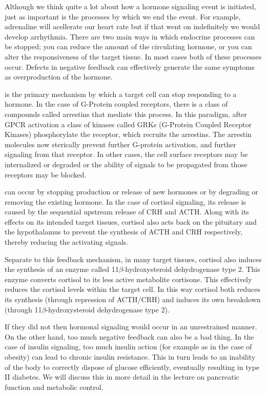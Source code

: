 \documentclass{tufte-handout}
\begin{document}
Although we think quite a lot about how a hormone signaling event is initiated, just as important is the processes by which we end the event.  For example, adrenaline will acellerate our heart rate but if that went on indefinitely we would develop arrhythmia.  There are two main ways in which endocrine processes can be stopped;  you can reduce the amount of the circulating hormone, or you can alter the responsiveness of the target tissue.  In most cases both of these processes occur.  Defects in negative feedback can effectively generate the same symptoms as overproduction of the hormone.

 is the primary mechanism by which a target cell can stop responding to a hormone.  In the case of G-Protein coupled receptors, there is a class of compounds called arrestins that mediate this process.  In this paradigm, after GPCR activation a class of kinases called GRKs (G-Protein Coupled Receptor Kinases) phosphorylate the receptor, which recruits the arrestins.  The arrestin molecules now sterically prevent further G-protein activation, and further signaling from that receptor.  In other cases, the cell surface receptors may be internalized or degraded or the ability of signals to be propagated from those receptors may be blocked.

 can occur by stopping production or release of new hormones or by degrading or removing the existing hormone.  In the case of cortisol signaling, its release is caused by the sequential upstream release of CRH and ACTH.  Along with its effects on its intended target tissues, cortisol also acts back on the pituitary and the hypothalamus to prevent the synthesis of ACTH and CRH respectively, thereby reducing the activating signals.  

Separate to this feedback mechanism, in many target tissues, cortisol also induces the synthesis of an enzyme called 11$\beta$-hydroxysteroid dehydrogenase type 2.  This enzyme converts cortisol to its less active metabolite cortisone\cite{Hubener1956}.  This effectively reduces the cortisol levels within the target cell.  In this way cortisol both reduces its synthesis (through repression of ACTH/CRH) and induces its own breakdown (through 11$\beta$-hydroxysteroid dehydrogenase type 2).

  If they did not then hormonal signaling would occur in an unrestrained manner.  On the other hand, too much negative feedback can also be a bad thing.  In the case of insulin signaling, too much insulin action (for example as in the case of obesity) can lead to chronic insulin resistance.  This in turn leads to an inability of the body to correctly dispose of glucose efficiently, eventually resulting in type II diabetes.  We will discuss this in more detail in the lecture on pancreatic function and metabolic control.
\end{document}
